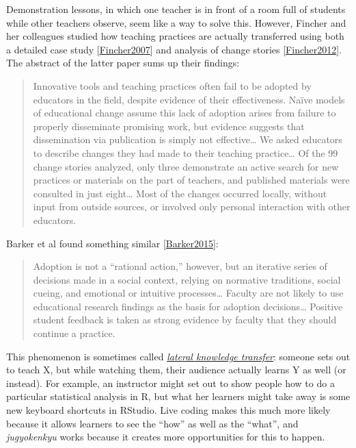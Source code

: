 \documentclass[10pt,statementpaper]{memoir}
\begin{document}
Demonstration lessons, in which one teacher is in front of a room full
of students while other teachers observe, seem like a way to solve this.
However, Fincher and her colleagues studied how teaching practices are
actually transferred using both a detailed case study
{[}\href{biblio.html\#fincher-warrens-questions}{Fincher2007}{]} and
analysis of change stories
{[}\href{biblio.html\#fincher-stories-change}{Fincher2012}{]}. The
abstract of the latter paper sums up their findings:

\begin{quote}
Innovative tools and teaching practices often fail to be adopted by
educators in the field, despite evidence of their effectiveness. Naïve
models of educational change assume this lack of adoption arises from
failure to properly disseminate promising work, but evidence suggests
that dissemination via publication is simply not effective\ldots{} We
asked educators to describe changes they had made to their teaching
practice\ldots{} Of the 99 change stories analyzed, only three
demonstrate an active search for new practices or materials on the part
of teachers, and published materials were consulted in just
eight\ldots{} Most of the changes occurred locally, without input from
outside sources, or involved only personal interaction with other
educators.
\end{quote}

\noindent
Barker et al found something similar
{[}\href{biblio.html\#barker-practice-adoption}{Barker2015}{]}:

\begin{quote}
Adoption is not a ``rational action,'' however, but an iterative series
of decisions made in a social context, relying on normative traditions,
social cueing, and emotional or intuitive processes\ldots{} Faculty are
not likely to use educational research findings as the basis for
adoption decisions\ldots{} Positive student feedback is taken as strong
evidence by faculty that they should continue a practice.
\end{quote}

This phenomenon is sometimes called
\emph{\href{gloss.html\#lateral-knowledge-transfer}{lateral knowledge
transfer}}: someone sets out to teach X, but while watching them, their
audience actually learns Y as well (or instead). For example, an
instructor might set out to show people how to do a particular
statistical analysis in R, but what her learners might take away is some
new keyboard shortcuts in RStudio. Live coding makes this much more
likely because it allows learners to see the ``how'' as well as the
``what'', and \emph{jugyokenkyu} works because it creates more
opportunities for this to happen.
\end{document}

